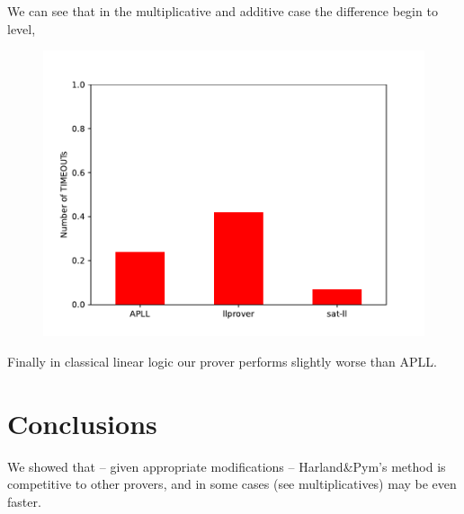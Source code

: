 \documentclass[a4paper, 12pt, tesi, english]{report}
\begin{document}
We can see that in the multiplicative and additive case the difference begin to level, 
\begin{figure}[h!]
	\centering
	\includegraphics{./images/mall.pdf}
\end{figure}
Finally in classical linear logic our prover performs slightly worse than APLL.

\chapter{Conclusions}
We showed that -- given appropriate modifications -- Harland\&Pym's method is competitive to other provers, and in some cases (see multiplicatives) may be even faster.



\end{document}
